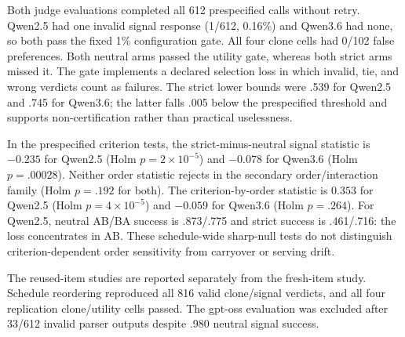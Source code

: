 \begin{table}[t]
\caption{Fresh-item results on 102 matched tasks. Clone cells report false preferences and exact one-sided 95\% upper bounds; signal cells report chosen-answer success and one-sided 95\% task-bootstrap lower bounds. The fixed utility threshold is .75.}
\label{tab:fresh-primary}
\centering
\scriptsize
\setlength{\tabcolsep}{2.0pt}
\end{table}

Both judge evaluations completed all 612 prespecified calls without retry. Qwen2.5 had one invalid signal response (1/612, 0.16\%) and Qwen3.6 had none, so both pass the fixed 1\% configuration gate. All four clone cells had 0/102 false preferences. Both neutral arms passed the utility gate, whereas both strict arms missed it. The gate implements a declared selection loss in which invalid, tie, and wrong verdicts count as failures. The strict lower bounds were .539 for Qwen2.5 and .745 for Qwen3.6; the latter falls .005 below the prespecified threshold and supports non-certification rather than practical uselessness.

In the prespecified criterion tests, the strict-minus-neutral signal statistic is $-0.235$ for Qwen2.5 (Holm $p=2\!\times\!10^{-5}$) and $-0.078$ for Qwen3.6 (Holm $p=.00028$). Neither order statistic rejects in the secondary order/interaction family (Holm $p=.192$ for both). The criterion-by-order statistic is $0.353$ for Qwen2.5 (Holm $p=4\!\times\!10^{-5}$) and $-0.059$ for Qwen3.6 (Holm $p=.264$). For Qwen2.5, neutral AB/BA success is .873/.775 and strict success is .461/.716: the loss concentrates in AB. These schedule-wide sharp-null tests do not distinguish criterion-dependent order sensitivity from carryover or serving drift.

The reused-item studies are reported separately from the fresh-item study. Schedule reordering reproduced all 816 valid clone/signal verdicts, and all four replication clone/utility cells passed. The gpt-oss evaluation was excluded after 33/612 invalid parser outputs despite .980 neutral signal success.
